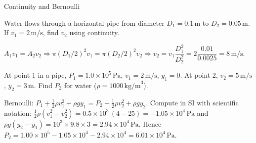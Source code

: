 \begin{KnowledgePoint}{Continuity and Bernoulli \Core}
  \KPProblems
\begin{cheatproblem}
  Water flows through a horizontal pipe from diameter $D_1=0.1\,\text{m}$ to $D_2=0.05\,\text{m}$. If $v_1=2\,\text{m/s}$, find $v_2$ using continuity.
\begin{solutionbox}
  $A_1v_1=A_2v_2\Rightarrow\pi(D_1/2)^2v_1=\pi(D_2/2)^2v_2\Rightarrow v_2=v_1\dfrac{D_1^2}{D_2^2}=2\dfrac{0.01}{0.0025}=8\,\text{m/s}$.
\end{solutionbox}
\end{cheatproblem}
\begin{cheatproblem}
  At point 1 in a pipe, $P_1=1.0\times10^5\,\text{Pa}$, $v_1=2\,\text{m/s}$, $y_1=0$. At point 2, $v_2=5\,\text{m/s}$, $y_2=3\,\text{m}$. Find $P_2$ for water ($\rho=1000\,\text{kg/m}^3$).
\begin{solutionbox}
  Bernoulli: $P_1+\tfrac12\rho v_1^2+\rho gy_1=P_2+\tfrac12\rho v_2^2+\rho gy_2$.
  Compute in SI with scientific notation:
  $\tfrac12\rho(v_1^2-v_2^2)=0.5\times10^3\,(4-25)=-1.05\times10^4\,\text{Pa}$ and
  $\rho g(y_2-y_1)=10^3\times9.8\times3=2.94\times10^4\,\text{Pa}$.
  Hence $P_2=1.00\times10^5-1.05\times10^4-2.94\times10^4=6.01\times10^4\,\text{Pa}$.
\end{solutionbox}
\end{cheatproblem}
\end{KnowledgePoint}

